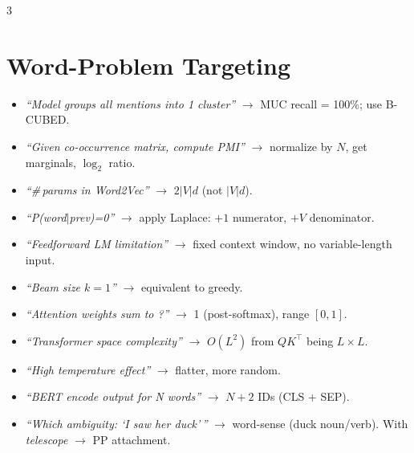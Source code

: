 \documentclass[8pt,a4paper,landscape]{extarticle}
\begin{document}
\begin{multicols*}{3}
    \section*{Word-Problem Targeting}
    \begin{itemize}
        \item \emph{``Model groups all mentions into 1 cluster''} $\to$ MUC recall = 100\%; use B-CUBED.
        \item \emph{``Given co-occurrence matrix, compute PMI''} $\to$ normalize by $N$, get marginals, $\log_2$ ratio.
        \item \emph{``\#\,params in Word2Vec''} $\to$ $2|V|d$ (not $|V|d$).
        \item \emph{``P(word$|$prev)=0''} $\to$ apply Laplace: $+1$ numerator, $+V$ denominator.
        \item \emph{``Feedforward LM limitation''} $\to$ fixed context window, no variable-length input.
        \item \emph{``Beam size $k=1$''} $\to$ equivalent to greedy.
        \item \emph{``Attention weights sum to ?''} $\to$ 1 (post-softmax), range $[0,1]$.
        \item \emph{``Transformer space complexity''} $\to$ $O(L^2)$ from $QK^\top$ being $L{\times}L$.
        \item \emph{``High temperature effect''} $\to$ flatter, more random.
        \item \emph{``BERT encode output for N words''} $\to$ $N+2$ IDs (CLS + SEP).
        \item \emph{``Which ambiguity: `I saw her duck'\,''} $\to$ word-sense (duck noun/verb). With \emph{telescope} $\to$ PP attachment.
    \end{itemize}

\end{multicols*}
\end{document}
